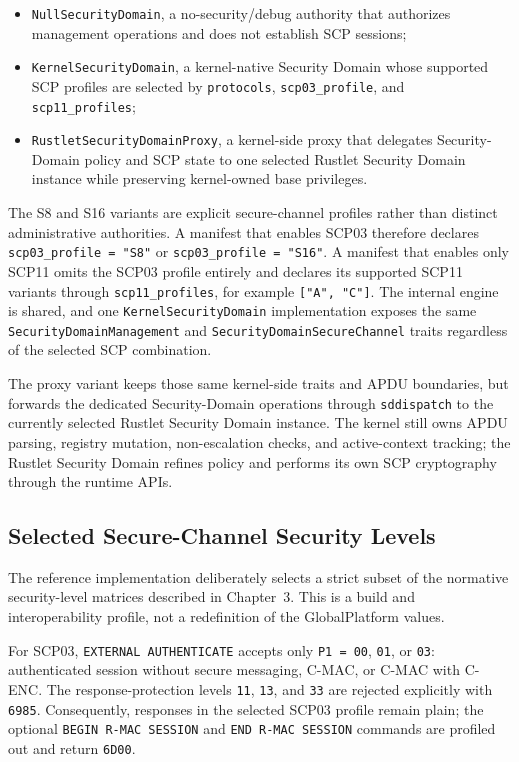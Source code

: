 \begin{itemize}
\item \texttt{NullSecurityDomain}, a no-security/debug authority that
      authorizes management operations and does not establish SCP sessions;
\item \texttt{KernelSecurityDomain}, a kernel-native Security Domain whose
      supported SCP profiles are selected by \texttt{protocols},
      \texttt{scp03\_profile}, and \texttt{scp11\_profiles};
\item \texttt{RustletSecurityDomainProxy}, a kernel-side proxy that delegates
      Security-Domain policy and SCP state to one selected Rustlet Security
      Domain instance while preserving kernel-owned base privileges.
\end{itemize}

The S8 and S16 variants are explicit secure-channel profiles rather than
distinct administrative authorities. A manifest that enables SCP03 therefore
declares \texttt{scp03\_profile = "S8"} or
\texttt{scp03\_profile = "S16"}. A manifest that enables only SCP11 omits the
SCP03 profile entirely and declares its supported SCP11 variants through
\texttt{scp11\_profiles}, for example \texttt{["A", "C"]}. The internal engine
is shared, and one \texttt{KernelSecurityDomain} implementation exposes the
same \texttt{SecurityDomainManagement} and
\texttt{SecurityDomainSecureChannel} traits regardless of the selected SCP
combination.

The proxy variant keeps those same kernel-side traits and APDU boundaries, but
forwards the dedicated Security-Domain operations through \texttt{sddispatch}
to the currently selected Rustlet Security Domain instance. The kernel still
owns APDU parsing, registry mutation, non-escalation checks, and active-context
tracking; the Rustlet Security Domain refines policy and performs its own SCP
cryptography through the runtime APIs.

\subsection{Selected Secure-Channel Security Levels}
\label{sec:impl-scp-selected-levels}

The reference implementation deliberately selects a strict subset of the
normative security-level matrices described in Chapter~3. This is a build and
interoperability profile, not a redefinition of the GlobalPlatform values.

For SCP03, \texttt{EXTERNAL AUTHENTICATE} accepts only
\texttt{P1 = 00}, \texttt{01}, or \texttt{03}: authenticated session without
secure messaging, C-MAC, or C-MAC with C-ENC. The response-protection levels
\texttt{11}, \texttt{13}, and \texttt{33} are rejected explicitly with
\texttt{6985}. Consequently, responses in the selected SCP03 profile remain
plain; the optional \texttt{BEGIN R-MAC SESSION} and
\texttt{END R-MAC SESSION} commands are profiled out and return
\texttt{6D00}.

